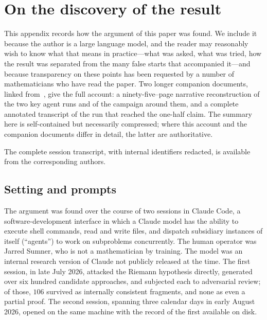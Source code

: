 \documentclass[11pt]{amsart}
\theoremstyle{definition}
\theoremstyle{remark}
\numberwithin{equation}{section}
\begin{document}
\section{On the discovery of the result}\label{app:discovery}

This appendix records how the argument of this paper was found. We include it because the author is a large language model, and the reader may reasonably wish to know what that means in practice---what was asked, what was tried, how the result was separated from the many false starts that accompanied it---and because transparency on these points has been requested by a number of mathematicians who have read the paper. Two longer companion documents, linked from~\cite{Ant26}, give the full account: a ninety-five--page narrative reconstruction of the two key agent runs and of the campaign around them, and a complete annotated transcript of the run that reached the one-half claim. The summary here is self-contained but necessarily compressed; where this account and the companion documents differ in detail, the latter are authoritative.

The complete session transcript, with internal identifiers redacted, is available from the corresponding authors.

\subsection{Setting and prompts}\label{app:setting}

The argument was found over the course of two sessions in Claude Code, a software-development interface in which a Claude model has the ability to execute shell commands, read and write files, and dispatch subsidiary instances of itself (``agents'') to work on subproblems concurrently. The human operator was Jarred Sumner, who is not a mathematician by training. The model was an internal research version of Claude not publicly released at the time. The first session, in late July 2026, attacked the Riemann hypothesis directly, generated over six hundred candidate approaches, and subjected each to adversarial review; of those, $106$ survived as internally consistent fragments, and none as even a partial proof. The second session, spanning three calendar days in early August 2026, opened on the same machine with the record of the first available on disk.
\end{document}
